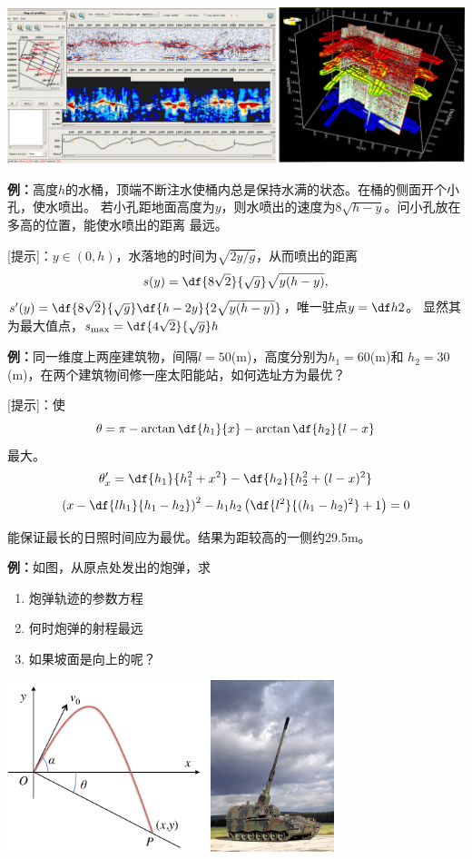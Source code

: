 \begin{shaded}
\begin{center}
		\includegraphics[width=.8\textwidth]{./images/ch3/RS-dataP-2.jpg}
	\end{center}
\end{shaded}

{\bf 例：}高度$h$的水桶，顶端不断注水使桶内总是保持水满的状态。在桶的侧面开个小孔，使水喷出。
若小孔距地面高度为$y$，则水喷出的速度为$8\sqrt{h-y}$。问小孔放在多高的位置，能使水喷出的距离
最远。

[提示]：$y\in(0,h)$，水落地的时间为$\sqrt{2y/g}$，从而喷出的距离
$$s(y)=\df{8\sqrt{2}}{\sqrt g}\sqrt{y(h-y)},$$
$s'(y)=\df{8\sqrt{2}}{\sqrt g}\df{h-2y}{2\sqrt{y(h-y)}}$，唯一驻点$y=\df h2$。
显然其为最大值点，$s_{\max}=\df{4\sqrt 2}{\sqrt{g}}h$

{\bf 例：}同一维度上两座建筑物，间隔$l=50$(m)，高度分别为$h_1=60$(m)和
$h_2=30$(m)，在两个建筑物间修一座太阳能站，如何选址方为最优？

[提示]：使
$$\theta=\pi-\arctan\df{h_1}{x}-\arctan\df{h_2}{l-x}$$
最大。
$$\theta'_x=\df{h_1}{h_1^2+x^2}-\df{h_2}{h_2^2+(l-x)^2}$$
$$\left(x-\df{lh_1}{h_1-h_2}\right)^2-h_1h_2\left(\df{l^2}
{(h_1-h_2)^2}+1\right)=0$$

能保证最长的日照时间应为最优。结果为距较高的一侧约29.5m。

{\bf 例：}如图，从原点处发出的炮弹，求
\begin{enumerate}[(1)]
  \setlength{\itemindent}{1cm}
  \item 炮弹轨迹的参数方程
  \item 何时炮弹的射程最远
  \item 如果坡面是向上的呢？
\end{enumerate}
\begin{center}
	\includegraphics[height=5cm]{./images/ch5/bFly.pdf}\quad
	\includegraphics[height=5cm]{./images/ch3/hCannon.jpg}
\end{center}


